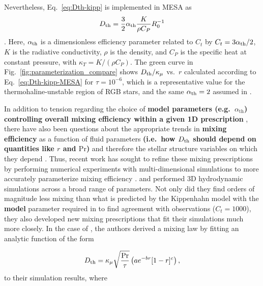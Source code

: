 Nevertheless, Eq.~\eqref{eq:Dth-kipp} is implemented in MESA as
\begin{equation} \label{eq:Dth-kipp-MESA}
    \Dth = \frac{3}{2} \alpha_{\rm{th}} \frac{K}{\rho C_P}R_0^{-1}
\end{equation}
\citep[see Eq.~(14) of][]{mesa2}. 
Here, $\alpha_{\rm{th}}$ is a dimensionless efficiency parameter related to $C_t$ by $C_t = 3\alpha_{\rm{th}}/2$, $K$ is the radiative conductivity, $\rho$ is the density, and $C_P$ is the specific heat at constant pressure, with $\kappa_T = K/(\rho C_P)$. 
The green curve in Fig.~\ref{fig:parameterization_compare} shows $D_\mathrm{th}/\kappa_\mu$ vs.~$r$ calculated according to Eq.~\eqref{eq:Dth-kipp-MESA} for $\tau = 10^{-6}$, which is a representative value for the thermohaline-unstable region of RGB stars, and the same $\alpha_{\rm{th}} = 2$ assumed in \citet{CantielloLanger2010}.

In addition to tension regarding the choice of \textbf{model parameters (e.g.~$\alpha_\mathrm{th}$) controlling overall mixing efficiency within a given 1D prescription} \citep[see e.g.][for further discussion]{Ulrich1972, kippenhahn_etal_1980, charbonnel_thermohaline_2007, CantielloLanger2010,traxler_etal_2011}, there have also been questions about the appropriate trends in \textbf{mixing efficiency} as a function of fluid parameters \textbf{(i.e.~how $D_\mathrm{th}$ should depend on quantities like $r$ and $\mathrm{Pr}$)} and therefore the stellar structure variables on which they depend \citep{garaud_DDC_review_2018}.
Thus, recent work has sought to refine these mixing prescriptions by performing numerical experiments with multi-dimensional simulations to more accurately parameterize mixing efficiency \citep{Denissenkov2010thermohaline,traxler_etal_2011}. 
\citet{traxler_etal_2011} and \citet{brown_etal_2013} performed 3D hydrodynamic simulations across a broad range of parameters. 
Not only did they find orders of magnitude less mixing than what is predicted by the Kippenhahn model with the \textbf{model} parameter required in \citet{charbonnel_thermohaline_2007} to find agreement with observations ($C_t = 1000$), they also developed new mixing prescriptions that fit their simulations much more closely. 
In the case of \citet{traxler_etal_2011}, the authors derived a mixing law by fitting an
analytic function 
of the form

\begin{equation} \label{eqn:trax_model}
   \Dth = \kappa_{\mu}\sqrt{\frac{\mathrm{Pr}}{\tau}}\left(a e^{-br}[1 - r]^c\right),
\end{equation}
to their simulation results,
where 

